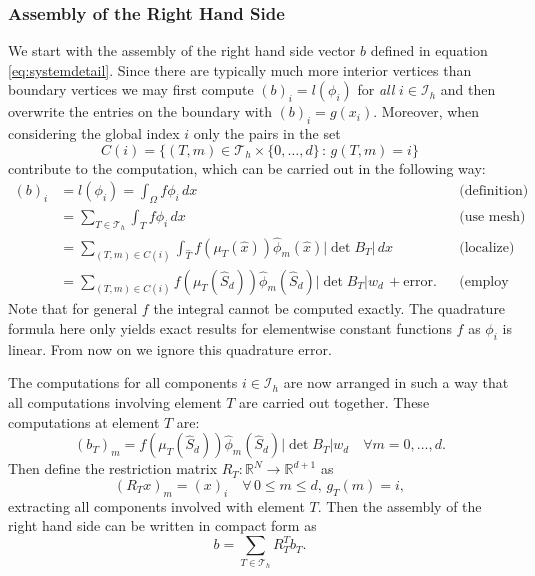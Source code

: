 \documentclass[a4paper,12pt]{article}
\begin{document}
\subsubsection*{Assembly of the Right Hand Side}

We start with the assembly of the right hand side vector $b$
defined in equation \eqref{eq:systemdetail}. Since there are typically much more 
interior vertices than boundary vertices we may first compute $(b)_i = l(\phi_i)$
for {\em all} $i\in\mathcal{I}_h$ and then overwrite the entries on the boundary
with $(b)_i = g(x_i)$. Moreover, when considering the global index $i$
only the pairs in the set
$$C(i) = \{(T,m)\in\mathcal{T}_h\times\{0,\ldots,d\} \,:\, g(T,m)=i\}$$
contribute to the computation, which can be carried out in the following way:
\begin{align*}
(b)_i &= l(\phi_i) = \int_\Omega f \phi_i\,dx &&\text{(definition)} \\
&= \sum_{T\in\mathcal{T}_h} \int_T f \phi_i\,dx &&\text{(use mesh)} \\
&= \sum_{(T,m)\in C(i)} \int_{\hat T} f(\mu_T(\hat x)) \hat\phi_m(\hat x) |\det B_T|\,dx 
&&\text{(localize)} \\
&= \sum_{(T,m)\in C(i)} 
f(\mu_T(\hat S_d)) \hat\phi_m(\hat S_d) |\det B_T| w_d \, + \text{error}. &&\text{(employ quadrature)} 
\end{align*}
Note that for general $f$ the integral cannot be computed exactly. The
quadrature formula here only yields exact results for elementwise constant
functions $f$ as $\phi_i$ is linear. From now on we ignore this quadrature error.

The computations for all components $i\in\mathcal{I}_h$ are now arranged
in such a way that all computations involving element $T$ are carried out together.
These computations at element $T$ are:
\begin{equation}
(b_T)_m =  f(\mu_T(\hat S_d)) \hat\phi_m(\hat S_d) |\det B_T| w_d \quad \forall m=0,\ldots,d .
\label{eq:lambda_volume}
\end{equation}
Then define the restriction matrix 
$R_T : \mathbb{R}^N \to \mathbb{R}^{d+1}$ as
\begin{equation}
(R_T x)_m = (x)_i \quad \forall \,0\leq m \leq d, \,g_T(m)=i,
\end{equation}
extracting all components involved with element $T$. Then
the assembly of the right hand side can be written in compact form as
\begin{equation}
b = \sum_{T\in\mathcal{T}_h} R_T^T b_T .
\label{eq:rhsassembly}
\end{equation}
\end{document}
